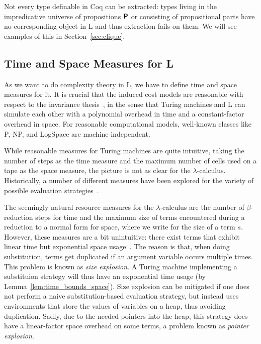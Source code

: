 \begin{remark}
  Not every type definable in Coq can be extracted: types living in the impredicative universe of propositions $\textsf{\bfseries P}$ or consisting of propositional parts have no corresponding object in L and thus extraction fails on them. 
  We will see examples of this in Section~\ref{sec:clique}. 
\end{remark}

\subsection{Time and Space Measures for L}\label{sec:time_and_space}
As we want to do complexity theory in L, we have to define time and space measures for it.
It is crucial that the induced cost models are reasonable with respect to the invariance thesis~\cite{slot_boas:invariance}, in the sense that Turing machines and L can simulate each other with a polynomial overhead in time and a constant-factor overhead in space. For reasonable computational models, well-known classes like \textsf{P}, \textsf{NP}, and \textsf{LogSpace} are machine-independent. 

While reasonable measures for Turing machines are quite intuitive, taking the number of steps as the time measure and the maximum number of cells used on a tape as the space measure, the picture is not as clear for the $\lambda$-calculus. Historically, a number of different measures have been explored for the variety of possible evaluation strategies~\cite{Accattoli:cost_models}.

The seemingly natural resource measures for the $\lambda$-calculus are the number of $\beta$-reduction steps for time and the maximum size of terms encountered during a reduction to a normal form for space, where we write  for the size of a term $s$. 
However, these measures are a bit unintuitive: there exist terms that exhibit linear time but exponential space usage~\cite{ForsterKunzeRoth:2019:wcbv-Reasonable}. The reason is that, when doing substitution, terms get duplicated if an argument variable occurs multiple times. This problem is known as \emph{size explosion}. A Turing machine implementing a substituion strategy will thus have an exponential time usage (by Lemma~\ref{lem:time_bounds_space}). 
Size explosion can be mitigated if one does not perform a naive substitution-based evaluation strategy, but instead uses environments that store the values of variables on a heap, thus avoiding duplication. Sadly, due to the needed pointers into the heap, this strategy does have a linear-factor space overhead on some terms, a problem known as \emph{pointer explosion}.

